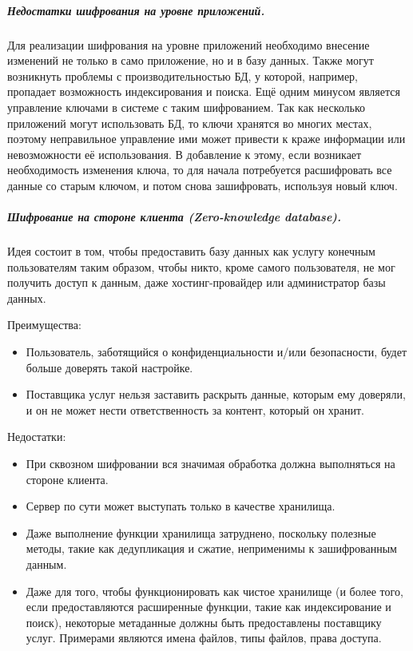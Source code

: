 \subparagraph{Недостатки шифрования на уровне приложений.}

Для реализации шифрования на уровне приложений необходимо внесение изменений не только в само
приложение, но и в базу данных. Также могут возникнуть проблемы с производительностью БД, у
которой, например, пропадает возможность индексирования и поиска. Ещё одним минусом является
управление ключами в системе с таким шифрованием. Так как несколько приложений могут использовать
БД, то ключи хранятся во многих местах, поэтому неправильное управление ими может привести к краже
информации или невозможности её использования. В добавление к этому, если возникает необходимость
изменения ключа, то для начала потребуется расшифровать все данные со старым ключом, и потом снова
зашифровать, используя новый ключ.

\subparagraph{Шифрование на стороне клиента (Zero-knowledge database).}

Идея состоит в том, чтобы предоставить базу данных как услугу конечным пользователям таким образом,
чтобы никто, кроме самого пользователя, не мог получить доступ к данным, даже хостинг-провайдер
или администратор базы данных.

Преимущества:
\begin{itemize}
    \item Пользователь, заботящийся о конфиденциальности и/или безопасности, будет больше доверять
        такой настройке.
    \item Поставщика услуг нельзя заставить раскрыть данные, которым ему доверяли, и он не может
        нести ответственность за контент, который он хранит.
\end{itemize}

Недостатки:
\begin{itemize}
    \item При сквозном шифровании вся значимая обработка должна выполняться на стороне клиента.
    \item Сервер по сути может выступать только в качестве хранилища.
    \item Даже выполнение функции хранилища затруднено, поскольку полезные методы, такие как
        дедупликация и сжатие, неприменимы к зашифрованным данным.
    \item Даже для того, чтобы функционировать как чистое хранилище (и более того, если
        предоставляются расширенные функции, такие как индексирование и поиск), некоторые
        метаданные должны быть предоставлены поставщику услуг. Примерами являются имена файлов,
        типы файлов, права доступа.
\end{itemize}

